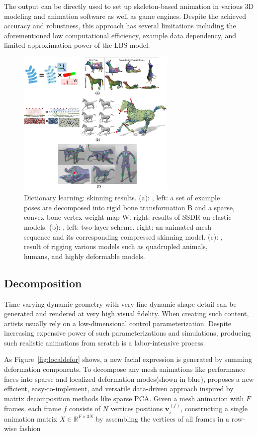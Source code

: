 The output can be directly used to set up skeleton-based animation in various 3D modeling and animation software as well as game engines. Despite the achieved accuracy and robustness, this approach has several limitations including the aforementioned low computational efficiency, example data dependency, and limited approximation power of the LBS model.


\begin{figure}[ht]
  \centering
  \includegraphics[width=3in]{images/skinning_decomposition}
  \caption{Dictionary learning: skinning results. (a): \cite{le2012smooth}, left: a set of example poses are decomposed into rigid bone transformation B and a sparse, convex bone-vertex weight map W. right: results of SSDR on elastic models. (b): \cite{le2013two}, left: two-layer scheme. right: an animated mesh sequence and its corresponding compressed skinning model. (c): \cite{le2014ras}, result of rigging various models such as quadrupled animals, humans, and highly deformable models.}
  \label{fig:skinning}
\end{figure}


\subsection{Decomposition}
\label{subsec:decomposition}


Time-varying dynamic geometry with very fine dynamic shape detail can be generated and rendered at very high visual fidelity.
When creating such content, artists usually rely on a low-dimensional control parameterization.
Despite increasing expensive power of such parameterizations and simulations, producing such realistic animations from scratch is a labor-intensive process.

As Figure~\ref{fig:localdefor} shows, a new facial expression is generated by summing deformation components.
To decompose any mesh animations like performance faces into sparse and localized deformation modes(shown in blue),
\cite{neumann2013sparse} proposes a new efficient, easy-to-implement, and versatile data-driven approach inspired by matrix decomposition methods like sparse PCA\cite{zou2006sparse}.
Given a mesh animation with $F$ frames, each frame $f$ consists of $N$ vertices positions $\mathbf{v}{_{i}^{(f)}}$,
constructing a single animation matrix $X\in \mathbb{R}^{F\times 3N}$ by assembling the vertices of all frames in a row-wise fashion

